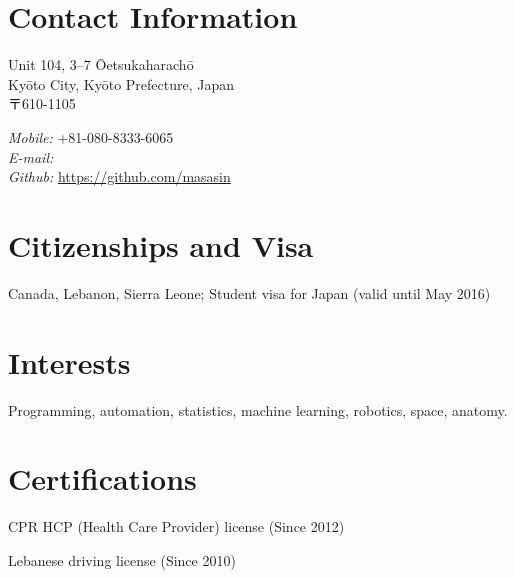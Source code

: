 \documentclass[10pt, a4paper]{article}
\begin{document}
\thispagestyle{plain}

\section{Contact Information}

\vspace{0.14cm}
\begin{minipage}{0.5\textwidth}
Unit 104, 3--7 Ōetsukaharachō\\
Kyōto City, Kyōto Prefecture, Japan\\
〒610-1105
\end{minipage}
\begin{minipage}{0.5\textwidth}
  \flushright
  \emph{Mobile:} +81-080-8333-6065\\
  \emph{E-mail:} \\
  \emph{Github:} \url{https://github.com/masasin}
\end{minipage}

\section{Citizenships and Visa}
Canada, Lebanon, Sierra Leone; Student visa for Japan (valid until May 2016)

\section{Interests}
Programming, automation, statistics, machine learning, robotics, space, anatomy.

\section{Certifications}
\begin{innerlist}
  \item CPR HCP (Health Care Provider) license (Since 2012)
  \item Lebanese driving license (Since 2010)
\end{innerlist}
\end{document}
